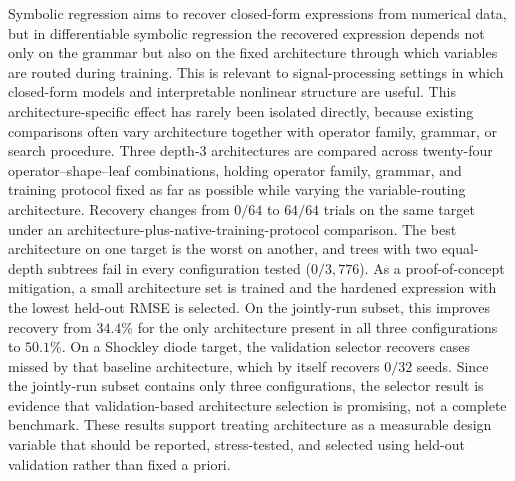 Symbolic regression aims to recover closed-form expressions
from numerical data, but in differentiable symbolic regression
the recovered expression depends not only on the grammar but
also on the fixed architecture through which variables are
routed during training.  This is relevant to signal-processing
settings in which closed-form models and interpretable nonlinear
structure are useful.  This architecture-specific effect has
rarely been isolated directly, because existing comparisons often
vary architecture together with operator family, grammar, or
search procedure.
Three depth-3 architectures are compared across twenty-four
operator--shape--leaf combinations, holding operator family,
grammar, and training protocol fixed as far as possible while
varying the variable-routing architecture.  Recovery changes from
$0/64$ to $64/64$ trials on the same target under an
architecture-plus-native-training-protocol comparison.  The best
architecture on one target is the worst on another, and trees
with two equal-depth subtrees fail in every configuration tested
($0/3{,}776$).  As a proof-of-concept mitigation, a small
architecture set is trained and the hardened expression with the
lowest held-out RMSE is selected.  On the jointly-run subset,
this improves recovery from $34.4\%$ for the only architecture
present in all three configurations to $50.1\%$.  On a
Shockley diode target, the validation selector recovers cases
missed by that baseline architecture, which by itself recovers
$0/32$ seeds.  Since the jointly-run subset contains only three
configurations, the selector result is evidence that
validation-based architecture selection is promising, not a
complete benchmark.  These results support treating architecture
as a measurable design variable that should be reported,
stress-tested, and selected using held-out validation rather
than fixed a priori.
